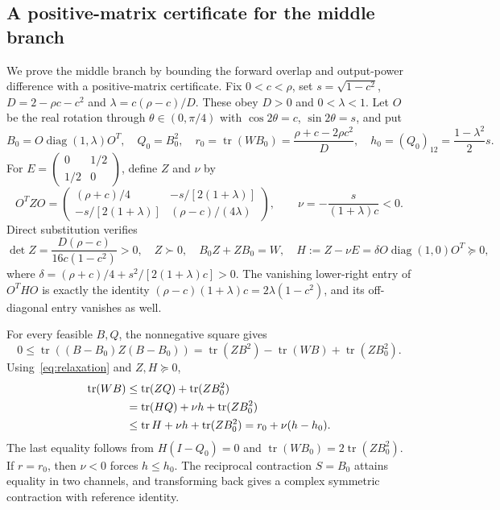 \documentclass[11pt,a4paper]{article}
\theoremstyle{remark}
\newcommand{\tr}{\operatorname{tr}}
\newcommand{\diag}{\operatorname{diag}}
\begin{document}
\subsection{A positive-matrix certificate for the middle branch}
We prove the middle branch by bounding the forward overlap and output-power difference with a positive-matrix certificate. Fix $0<c<\rho$, set $s=\sqrt{1-c^2}$, $D=2-\rho c-c^2$ and $\lambda=c(\rho-c)/D$. These obey $D>0$ and $0<\lambda<1$. Let $O$ be the real rotation through $\theta\in(0,\pi/4)$ with $\cos2\theta=c$, $\sin2\theta=s$, and put
\[
 B_0=O\diag(1,\lambda)O^T,\quad Q_0=B_0^2,\quad
 r_0=\tr(WB_0)=\frac{\rho+c-2\rho c^2}{D},\quad
 h_0=(Q_0)_{12}=\frac{1-\lambda^2}{2}s.
\]
For $E=\left(\begin{smallmatrix}0&1/2\\1/2&0\end{smallmatrix}\right)$, define $Z$ and $\nu$ by
\begin{equation}\label{eq:certificate}
 O^TZO=\begin{pmatrix}(\rho+c)/4&-s/[2(1+\lambda)]\\-s/[2(1+\lambda)]&(\rho-c)/(4\lambda)\end{pmatrix},
 \qquad \nu=-\frac{s}{(1+\lambda)c}<0.
\end{equation}
Direct substitution verifies
\begin{equation}\label{eq:certificate-identities}
 \det Z=\frac{D(\rho-c)}{16c(1-c^2)}>0,\quad Z\succ0,\quad
 B_0Z+ZB_0=W,\quad
 H:=Z-\nu E=\delta O\diag(1,0)O^T\succeq0,
\end{equation}
where $\delta=(\rho+c)/4+s^2/[2(1+\lambda)c]>0$. The vanishing lower-right entry of $O^THO$ is exactly the identity $(\rho-c)(1+\lambda)c=2\lambda(1-c^2)$, and its off-diagonal entry vanishes as well.

For every feasible $B,Q$, the nonnegative square gives
\[
 0\leq\tr((B-B_0)Z(B-B_0))
 =\tr(ZB^2)-\tr(WB)+\tr(ZB_0^2).
\]
Using~\eqref{eq:relaxation} and $Z,H\succeq0$,
\begin{align}\label{eq:dual-bound}
 \tr(WB)&\leq\tr(ZQ)+\tr(ZB_0^2)\notag\\
 &=\tr(HQ)+\nu h+\tr(ZB_0^2)\notag\\
 &\leq\tr H+\nu h+\tr(ZB_0^2)=r_0+\nu(h-h_0).
\end{align}
The last equality follows from $H(I-Q_0)=0$ and $\tr(WB_0)=2\tr(ZB_0^2)$. If $r=r_0$, then $\nu<0$ forces $h\leq h_0$. The reciprocal contraction $\widehat S=B_0$ attains equality in two channels, and transforming back gives a complex symmetric contraction with reference identity.
\end{document}

